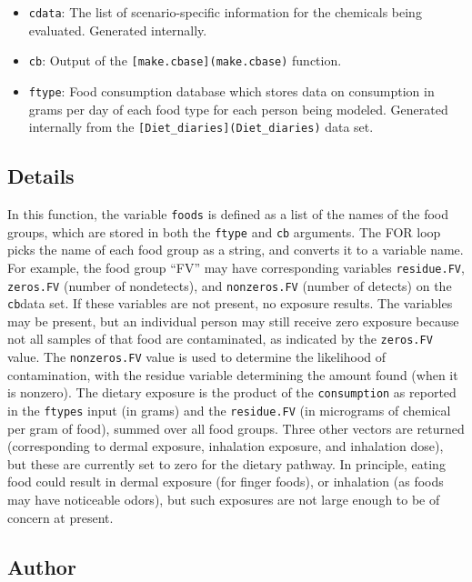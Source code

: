 \documentclass[
]{article}
\providecommand{\tightlist}{%
  \setlength{\itemsep}{0pt}\setlength{\parskip}{0pt}}
\begin{document}
\begin{itemize}
\tightlist
\item
  \texttt{cdata}: The list of scenario-specific information for the
  chemicals being evaluated. Generated internally.
\item
  \texttt{cb}: Output of the \texttt{{[}make.cbase{]}(make.cbase)}
  function.
\item
  \texttt{ftype}: Food consumption database which stores data on
  consumption in grams per day of each food type for each person being
  modeled. Generated internally from the
  \texttt{{[}Diet\_diaries{]}(Diet\_diaries)} data set.
\end{itemize}

\hypertarget{details-16}{%
\subsection{Details}\label{details-16}}

In this function, the variable \texttt{foods} is defined as a list of
the names of the food groups, which are stored in both the
\texttt{ftype} and \texttt{cb} arguments. The FOR loop picks the name of
each food group as a string, and converts it to a variable name. For
example, the food group ``FV'' may have corresponding variables
\texttt{residue.FV}, \texttt{zeros.FV} (number of nondetects), and
\texttt{nonzeros.FV} (number of detects) on the \texttt{cb}data set. If
these variables are not present, no exposure results. The variables may
be present, but an individual person may still receive zero exposure
because not all samples of that food are contaminated, as indicated by
the \texttt{zeros.FV} value. The \texttt{nonzeros.FV} value is used to
determine the likelihood of contamination, with the residue variable
determining the amount found (when it is nonzero). The dietary exposure
is the product of the \texttt{consumption} as reported in the
\texttt{ftypes} input (in grams) and the \texttt{residue.FV} (in
micrograms of chemical per gram of food), summed over all food groups.
Three other vectors are returned (corresponding to dermal exposure,
inhalation exposure, and inhalation dose), but these are currently set
to zero for the dietary pathway. In principle, eating food could result
in dermal exposure (for finger foods), or inhalation (as foods may have
noticeable odors), but such exposures are not large enough to be of
concern at present.

\hypertarget{author-17}{%
\subsection{Author}\label{author-17}}
\end{document}
